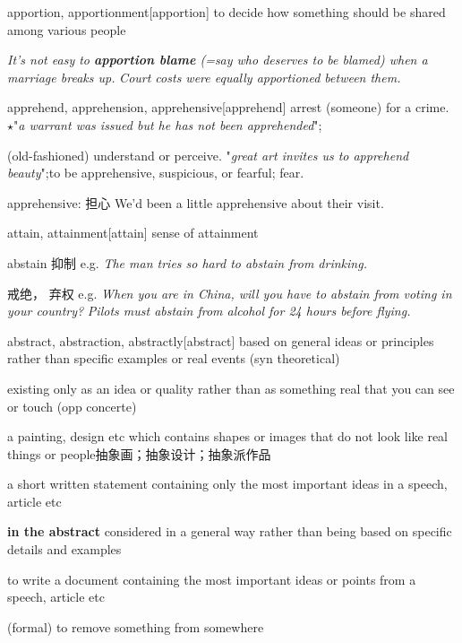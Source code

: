 \begin{DefWord}{apportion, apportionment}[apportion]
    to decide how something should be shared among various people

    \textit{It’s not easy to \textbf{apportion blame} (=say who deserves to be blamed) when a marriage breaks up.}
    \textit{Court costs were equally apportioned between them.}
\end{DefWord}

\begin{DefWord}{apprehend, apprehension, apprehensive}[apprehend]
    arrest (someone) for a crime.
    $\star$"\textit{a warrant was issued but he has not been apprehended}";
    
    (old-fashioned) understand or perceive.
    "\textit{great art invites us to apprehend beauty}";to be apprehensive, suspicious, or fearful; fear.

    apprehensive: 担心 We'd been a little {apprehensive} about their visit.
\end{DefWord}

\begin{DefWord}{attain, attainment}[attain]
    sense of attainment
\end{DefWord}

\begin{DefWord}{abstain}
    抑制
    e.g. \textit{The man tries so hard to abstain from drinking.}
    
    戒绝， 弃权
    e.g. \textit{When you are in China, will you have to abstain from voting in your country?}
    \textit{Pilots must abstain from alcohol for 24 hours before flying.}
\end{DefWord}

\begin{DefWord}{abstract, abstraction, abstractly}[abstract]
    based on general ideas or principles rather than specific examples or real events (syn theoretical)

    existing only as an idea or quality rather than as something real that you can see or touch (opp concerte)

    a painting, design etc which contains shapes or images that do not look like real things or people抽象画；抽象设计；抽象派作品

    a short written statement containing only the most important ideas in a speech, article etc
    
    \textbf{in the abstract} considered in a general way rather than being based on specific details and examples

    to write a document containing the most important ideas or points from a speech, article etc

    (formal) to remove something from somewhere
\end{DefWord}

